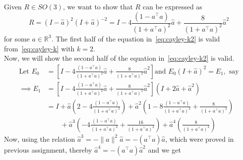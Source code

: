 Given \( R \in SO(3) \), we want to show that \( R \) can be expressed as
\begin{equation}\label{eq:cayley-k2}
    R
    =
    {(I - \widehat{a})}^{2} {(I + \widehat{a})}^{-2}
    =
    I - 4 \frac{(1 - a^{\top} a)}{{(1 + a^{\top} a)}^{2}} \widehat{a} + \frac{8}{{(1 + a^{\top} a)}^{2}} \widehat{a}^{2}
\end{equation}
for some \( a \in \mathbb{R}^{3} \).
The first half of the equation in~\eqref{eq:cayley-k2} is valid from~\eqref{eq:cayley-k} with \( k = 2 \). \\
Now, we will show the second half of the equation in~\eqref{eq:cayley-k2} is valid.
\begin{align*}
    \text{Let }
    E_0
     & =
    \left[
        I
        - 4 \frac{(1 - a^{\top} a)}{{(1 + a^{\top} a)}^{2}} \widehat{a}
        + \frac{8}{{(1 + a^{\top} a)}^{2}} \widehat{a}^{2}
        \right]
    \text{and }
    E_0
    {(I + \widehat{a})}^{2}
    =
    E_1
    , \text{ say}
    \\
    \implies
    E_1
     & =
    \left[
        I
        - 4 \frac{(1 - a^{\top} a)}{{(1 + a^{\top} a)}^{2}} \widehat{a}
        + \frac{8}{{(1 + a^{\top} a)}^{2}} \widehat{a}^{2}
        \right]
    (I + 2 \widehat{a} + \widehat{a}^{2})
    \\ & =
    I
    + \widehat{a} \left( 2 - 4 \frac{(1 - a^{\top} a)}{{(1 + a^{\top} a)}^{2}} \right)
    + \widehat{a}^{2} \left( 1 - 8 \frac{(1 - a^{\top} a)}{{(1 + a^{\top} a)}^{2}} + \frac{8}{{(1 + a^{\top} a)}^{2}} \right)
    \\ & \qquad
    + \widehat{a}^{3} \left( -4 \frac{(1 - a^{\top} a)}{{(1 + a^{\top} a)}^{2}} + \frac{16}{{(1 + a^{\top} a)}^{2}} \right)
    + \widehat{a}^{4} \left( \frac{8}{{(1 + a^{\top} a)}^{2}} \right)
\end{align*}
Now, using the relation \( \widehat{a}^{3} = - \| a \|^{2} \widehat{a} = - (a^{\top} a) \widehat{a} \), which were proved in previous assignment, thereby \( \widehat{a}^{4} = - (a^{\top} a) \widehat{a}^{2} \) and we get
